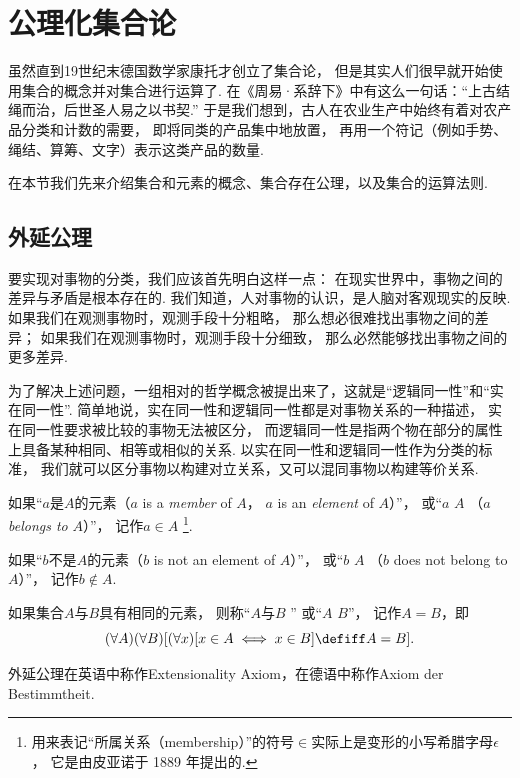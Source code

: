 \section{公理化集合论}
虽然直到19世纪末德国数学家康托才创立了集合论，
但是其实人们很早就开始使用集合的概念并对集合进行运算了.
在《周易·系辞下》中有这么一句话：“上古结绳而治，后世圣人易之以书契.”
于是我们想到，古人在农业生产中始终有着对农产品分类和计数的需要，
即将同类的产品集中地放置，
再用一个符记（例如手势、绳结、算筹、文字）表示这类产品的数量.

在本节我们先来介绍集合和元素的概念、集合存在公理，以及集合的运算法则.

\subsection{外延公理}
要实现对事物的分类，我们应该首先明白这样一点：
在现实世界中，事物之间的差异与矛盾是根本存在的.
我们知道，人对事物的认识，是人脑对客观现实的反映.
如果我们在观测事物时，观测手段十分粗略，
那么想必很难找出事物之间的差异；
如果我们在观测事物时，观测手段十分细致，
那么必然能够找出事物之间的更多差异.

为了解决上述问题，一组相对的哲学概念被提出来了，这就是“逻辑同一性”和“实在同一性”.
简单地说，实在同一性和逻辑同一性都是对事物关系的一种描述，
实在同一性要求被比较的事物无法被区分，
而逻辑同一性是指两个物在部分的属性上具备某种相同、相等或相似的关系.
以实在同一性和逻辑同一性作为分类的标准，
我们就可以区分事物以构建对立关系，又可以混同事物以构建等价关系.

\begin{definition}
如果“\(a\)是\(A\)的元素（\(a\) is a \emph{member} of \(A\)，
\(a\) is an \emph{element} of \(A\)）”，
或“\(a\)  \(A\)
（\(a\) \emph{belongs to} \(A\)）”，
记作\(a \in A\)
\footnote{
	用来表记“所属关系（membership）”的符号\(\in\)实际上是变形的小写希腊字母\(\epsilon\)，
	它是由皮亚诺于 1889 年提出的.
}.
\end{definition}

\begin{definition}
如果“\(b\)不是\(A\)的元素（\(b\) is not an element of \(A\)）”，
或“\(b\)  \(A\)
（\(b\) does not belong to \(A\)）”，
记作\(b \notin A\).
\end{definition}

\begin{axiom}[外延公理I]
如果集合\(A\)与\(B\)具有相同的元素，
则称“\(A\)与\(B\) ”
或“\(A\)  \(B\)”，
记作\(A=B\)，即
\begin{equation*}
	(\forall A)(\forall B)[
		(\forall x)[x \in A \iff x \in B]
		\defiff
		A=B
	].
\end{equation*}
\end{axiom}
外延公理在英语中称作Extensionality Axiom，在德语中称作Axiom der Bestimmtheit.

